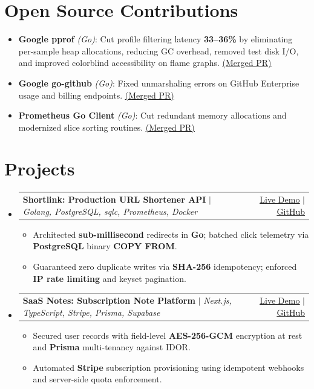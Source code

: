 \documentclass[letterpaper,11pt]{article}
\makeatletter
\newcommand{\resumeItem}[1]{\item\small{#1}}
\newcommand{\resumeProjectHeading}[2]{
  \item
    \begin{tabular*}{\textwidth}{l@{\extracolsep{\fill}}r}
      \small#1 & #2 \\
    \end{tabular*}\vspace{-2pt}
}
\newcommand{\resumeSubHeadingListStart}{\begin{itemize}[leftmargin=0in, label={}, itemsep=0.5pt, parsep=0pt, topsep=0.2pt]}
\newcommand{\resumeSubHeadingListEnd}{\end{itemize}\vspace{-2pt}}
\newcommand{\resumeItemListStart}{\begin{itemize}[leftmargin=12pt, label=\tiny$\bullet$, itemsep=0.5pt, parsep=0pt, topsep=0.2pt]}
\newcommand{\resumeItemListEnd}{\end{itemize}}
\makeatother
\begin{document}
\section{Open Source Contributions}
  \begin{itemize}[leftmargin=12pt, label=\tiny$\bullet$, itemsep=0.5pt, parsep=0pt, topsep=0.3pt]
    \resumeItem{\textbf{Google pprof} \emph{(Go)}: Cut profile filtering latency \textbf{33--36\%} by eliminating per-sample heap allocations, reducing GC overhead, removed test disk I/O, and improved colorblind accessibility on flame graphs. \href{https://github.com/google/pprof/pulls?q=author:kyyril}{\underline{(Merged PR)}}}
    \resumeItem{\textbf{Google go-github} \emph{(Go)}: Fixed unmarshaling errors on GitHub Enterprise usage and billing endpoints. \href{https://github.com/google/go-github/pull/4002}{\underline{(Merged PR)}}}
    \resumeItem{\textbf{Prometheus Go Client} \emph{(Go)}: Cut redundant memory allocations and modernized slice sorting routines. \href{https://github.com/prometheus/client_golang/pull/2176}{\underline{(Merged PR)}}}
  \end{itemize}\vspace{-2pt}
\section[Projects]{Projects \hfill \normalfont\footnotesize{}}
    \resumeSubHeadingListStart
      \resumeProjectHeading
          {\textbf{Shortlink: Production URL Shortener API} $|$ \emph{Golang, PostgreSQL, sqlc, Prometheus, Docker}}{{\href{https://shortlink-production-1c53.up.railway.app/docs}{\underline{Live Demo}}} $|$ {\href{https://github.com/kyyril/shortlink}{\underline{GitHub}}}}
          \resumeItemListStart
            \resumeItem{Architected \textbf{sub-millisecond} redirects in \textbf{Go}; batched click telemetry via \textbf{PostgreSQL} binary \textbf{COPY FROM}.}
            \resumeItem{Guaranteed zero duplicate writes via \textbf{SHA-256} idempotency; enforced \textbf{IP rate limiting} and keyset pagination.}
          \resumeItemListEnd
      \resumeProjectHeading
          {\textbf{SaaS Notes: Subscription Note Platform} $|$ \emph{Next.js, TypeScript, Stripe, Prisma, Supabase}}{{\href{https://saas-noteapp.vercel.app/}{\underline{Live Demo}}} $|$ {\href{https://github.com/kyyril/saas-noteapp}{\underline{GitHub}}}}
          \resumeItemListStart
            \resumeItem{Secured user records with field-level \textbf{AES-256-GCM} encryption at rest and \textbf{Prisma} multi-tenancy against IDOR.}
            \resumeItem{Automated \textbf{Stripe} subscription provisioning using idempotent webhooks and server-side quota enforcement.}
          \resumeItemListEnd
    \resumeSubHeadingListEnd
\end{document}
